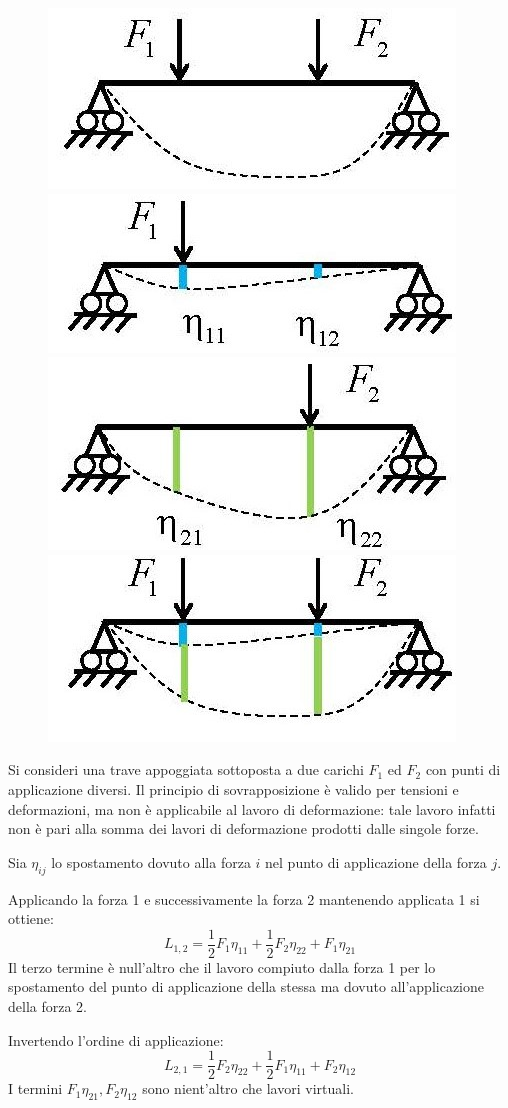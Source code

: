\documentclass{article}
\begin{document}
\begin{adjustwidth}{2in}{}
\begin{figure}[H]
	\centering
	\includegraphics[width=0.3\linewidth]{immagini/1.PARTE7_Pagina_65 (3)}
	\includegraphics[width=0.3\linewidth]{immagini/1.PARTE7_Pagina_65 (4)}
	\includegraphics[width=0.3\linewidth]{immagini/1.PARTE7_Pagina_65 (5)}
	\includegraphics[width=0.3\linewidth]{immagini/1.PARTE7_Pagina_65 (6)}
\end{figure}

	Si consideri una trave appoggiata sottoposta a due carichi $ F_1 $
	ed $ F_2 $ con punti di applicazione diversi.
	Il principio di sovrapposizione è valido per tensioni e
	deformazioni, ma non è applicabile al lavoro di deformazione: tale lavoro infatti non è pari alla somma dei lavori di deformazione prodotti dalle singole forze. \newline 
	
	Sia $\eta_{ij}$ lo spostamento dovuto alla forza $ i $ nel punto di applicazione
	della forza $ j $. \newline
	
	Applicando la forza 1 e successivamente la forza 2 mantenendo
	applicata 1 si ottiene:
	\[
	L_{1,2} = \dfrac{1}{2}F_1\eta_{11} + \dfrac{1}{2}F_2\eta_{22} +F_1\eta_{21}
	\]
	Il terzo termine è null'altro che il lavoro compiuto dalla forza 1 per lo
	spostamento del punto di applicazione della stessa ma dovuto
	all’applicazione della forza 2.\newline
	
	Invertendo l'ordine di applicazione: 
	\[
	L_{2,1} = \dfrac{1}{2}F_2\eta_{22} + \dfrac{1}{2}F_1\eta_{11} +F_2\eta_{12}
	\]
	I termini $F_1\eta_{21}, F_2\eta_{12}$ sono nient'altro che lavori virtuali. \newline 
	

\end{adjustwidth}
\end{document}
